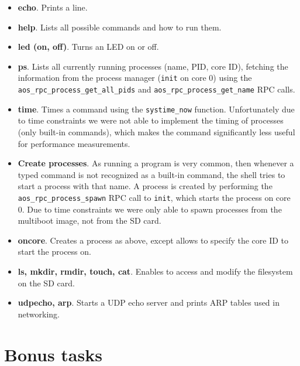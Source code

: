 \begin{itemize}

    \item
        \textbf{echo}. Prints a line.

    \item
        \textbf{help}. Lists all possible commands and how to run them.

    \item 
        \textbf{led (on, off)}. Turns an LED on or off.

    \item
        \textbf{ps}. Lists all currently running processes (name, PID, core ID), fetching the information from the process manager (\verb|init| on core 0) using the \verb|aos_rpc_process_get_all_pids| and \verb|aos_rpc_process_get_name| RPC calls.

    \item
        \textbf{time}. Times a command using the \verb|systime_now| function. Unfortunately due to time constraints we were not able to implement the timing of processes (only built-in commands), which makes the command significantly less useful for performance measurements.

    \item
        \textbf{Create processes}. As running a program is very common, then whenever a typed command is not recognized as a built-in command, the shell tries to start a process with that name. A process is created by performing the \verb|aos_rpc_process_spawn| RPC call to \verb|init|, which starts the process on core 0. Due to time constraints we were only able to spawn processes from the multiboot image, not from the SD card.

    \item
        \textbf{oncore}. Creates a process as above, except allows to specify the core ID to start the process on.

    \item
        \textbf{ls, mkdir, rmdir, touch, cat}. Enables to access and modify the filesystem on the SD card.

    \item
        \textbf{udpecho, arp}. Starts a UDP echo server and prints ARP tables used in networking.

\end{itemize}


\section{Bonus tasks}

